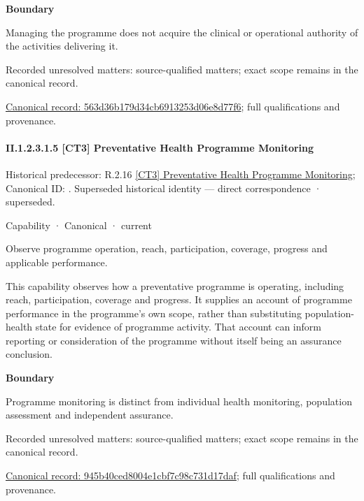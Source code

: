 \textbf{Boundary}



Managing the programme does not acquire the clinical or operational authority of the activities delivering it.


{\small Recorded unresolved matters: source-qualified matters; exact scope remains in the canonical record.}\par
{\footnotesize \href{../../../../continuum/strategy/capability/563d36b179d34cb6913253d06e8d77f6.md}{Canonical record: 563d36b179d34cb6913253d06e8d77f6}; full qualifications and provenance.}\par
\paragraph*{II.1.2.3.1.5 [CT3] Preventative Health Programme Monitoring}
\label{navigation:II.1.2.3.1.5}

{\small Historical predecessor: R.2.16 \hyperref[element:e05f6310f6d544efaca5568604f27dd8]{[CT3] Preventative Health Programme Monitoring}; Canonical ID: \texttt{}. Superseded historical identity — direct correspondence · superseded.}\par
\label{element:945b40ced8004e1cbf7c98c731d17daf}
{\small Capability · Canonical · current}\par

Observe programme operation, reach, participation, coverage, progress and applicable performance.



This capability observes how a preventative programme is operating, including reach, participation, coverage and progress. It supplies an account of programme performance in the programme's own scope, rather than substituting population-health state for evidence of programme activity. That account can inform reporting or consideration of the programme without itself being an assurance conclusion.



\textbf{Boundary}



Programme monitoring is distinct from individual health monitoring, population assessment and independent assurance.


{\small Recorded unresolved matters: source-qualified matters; exact scope remains in the canonical record.}\par
{\footnotesize \href{../../../../continuum/strategy/capability/945b40ced8004e1cbf7c98c731d17daf.md}{Canonical record: 945b40ced8004e1cbf7c98c731d17daf}; full qualifications and provenance.}\par
